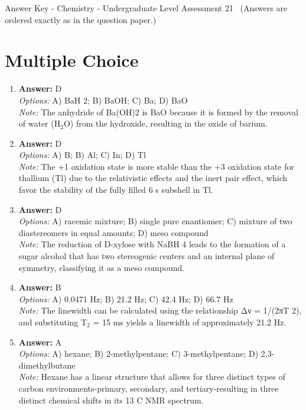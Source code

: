\documentclass[12pt]{article}
\begin{document}
\begin{center}
Answer Key - Chemistry - Undergraduate Level Assessment 21 \
\small (Answers are ordered exactly as in the question paper.)
\end{center}

\section*{Multiple Choice}
\begin{enumerate}[label=\arabic*.]
\item \textbf{Answer:} D
\\ \textit{Options:} A) BaH 2; B) BaOH; C) Ba; D) BaO
\\ \textit{Note:} The anhydride of Ba(OH)2 is BaO because it is formed by the removal of water (H$_{2}$O) from the hydroxide, resulting in the oxide of barium.
\item \textbf{Answer:} D
\\ \textit{Options:} A) B; B) Al; C) In; D) Tl
\\ \textit{Note:} The +1 oxidation state is more stable than the +3 oxidation state for thallium (Tl) due to the relativistic effects and the inert pair effect, which favor the stability of the fully filled 6 s subshell in Tl.
\item \textbf{Answer:} D
\\ \textit{Options:} A) racemic mixture; B) single pure enantiomer; C) mixture of two diastereomers in equal amounts; D) meso compound
\\ \textit{Note:} The reduction of D-xylose with NaBH 4 leads to the formation of a sugar alcohol that has two stereogenic centers and an internal plane of symmetry, classifying it as a meso compound.
\item \textbf{Answer:} B
\\ \textit{Options:} A) 0.0471 Hz; B) 21.2 Hz; C) 42.4 Hz; D) 66.7 Hz
\\ \textit{Note:} The linewidth can be calculated using the relationship Δν = 1/(2πT 2), and substituting T$_{2}$ = 15 ms yields a linewidth of approximately 21.2 Hz.
\item \textbf{Answer:} A
\\ \textit{Options:} A) hexane; B) 2-methylpentane; C) 3-methylpentane; D) 2,3-dimethylbutane
\\ \textit{Note:} Hexane has a linear structure that allows for three distinct types of carbon environments-primary, secondary, and tertiary-resulting in three distinct chemical shifts in its 13 C NMR spectrum.
\end{enumerate}
\end{document}

